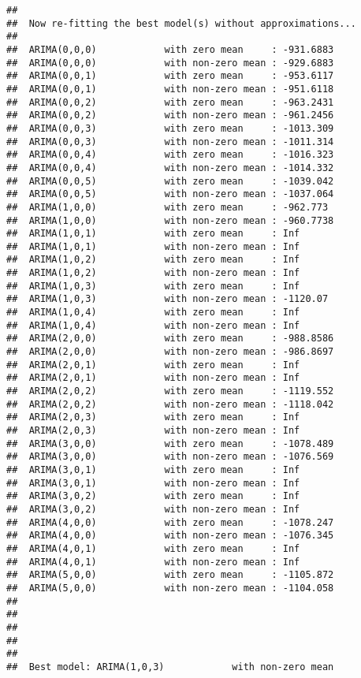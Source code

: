 \documentclass[]{article}
\begin{document}
\begin{verbatim}
## 
##  Now re-fitting the best model(s) without approximations...
## 
##  ARIMA(0,0,0)            with zero mean     : -931.6883
##  ARIMA(0,0,0)            with non-zero mean : -929.6883
##  ARIMA(0,0,1)            with zero mean     : -953.6117
##  ARIMA(0,0,1)            with non-zero mean : -951.6118
##  ARIMA(0,0,2)            with zero mean     : -963.2431
##  ARIMA(0,0,2)            with non-zero mean : -961.2456
##  ARIMA(0,0,3)            with zero mean     : -1013.309
##  ARIMA(0,0,3)            with non-zero mean : -1011.314
##  ARIMA(0,0,4)            with zero mean     : -1016.323
##  ARIMA(0,0,4)            with non-zero mean : -1014.332
##  ARIMA(0,0,5)            with zero mean     : -1039.042
##  ARIMA(0,0,5)            with non-zero mean : -1037.064
##  ARIMA(1,0,0)            with zero mean     : -962.773
##  ARIMA(1,0,0)            with non-zero mean : -960.7738
##  ARIMA(1,0,1)            with zero mean     : Inf
##  ARIMA(1,0,1)            with non-zero mean : Inf
##  ARIMA(1,0,2)            with zero mean     : Inf
##  ARIMA(1,0,2)            with non-zero mean : Inf
##  ARIMA(1,0,3)            with zero mean     : Inf
##  ARIMA(1,0,3)            with non-zero mean : -1120.07
##  ARIMA(1,0,4)            with zero mean     : Inf
##  ARIMA(1,0,4)            with non-zero mean : Inf
##  ARIMA(2,0,0)            with zero mean     : -988.8586
##  ARIMA(2,0,0)            with non-zero mean : -986.8697
##  ARIMA(2,0,1)            with zero mean     : Inf
##  ARIMA(2,0,1)            with non-zero mean : Inf
##  ARIMA(2,0,2)            with zero mean     : -1119.552
##  ARIMA(2,0,2)            with non-zero mean : -1118.042
##  ARIMA(2,0,3)            with zero mean     : Inf
##  ARIMA(2,0,3)            with non-zero mean : Inf
##  ARIMA(3,0,0)            with zero mean     : -1078.489
##  ARIMA(3,0,0)            with non-zero mean : -1076.569
##  ARIMA(3,0,1)            with zero mean     : Inf
##  ARIMA(3,0,1)            with non-zero mean : Inf
##  ARIMA(3,0,2)            with zero mean     : Inf
##  ARIMA(3,0,2)            with non-zero mean : Inf
##  ARIMA(4,0,0)            with zero mean     : -1078.247
##  ARIMA(4,0,0)            with non-zero mean : -1076.345
##  ARIMA(4,0,1)            with zero mean     : Inf
##  ARIMA(4,0,1)            with non-zero mean : Inf
##  ARIMA(5,0,0)            with zero mean     : -1105.872
##  ARIMA(5,0,0)            with non-zero mean : -1104.058
## 
## 
## 
## 
## 
##  Best model: ARIMA(1,0,3)            with non-zero mean
\end{verbatim}
\end{document}
